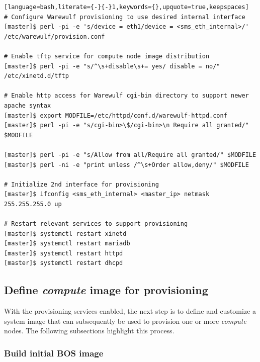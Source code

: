 \documentclass[letterpaper]{article}
\begin{document}
\begin{lstlisting}[language=bash,literate={-}{-}1,keywords={},upquote=true,keepspaces]
# Configure Warewulf provisioning to use desired internal interface
[master]$ perl -pi -e 's/device = eth1/device = <sms_eth_internal>/' /etc/warewulf/provision.conf

# Enable tftp service for compute node image distribution
[master]$ perl -pi -e "s/^\s+disable\s+= yes/ disable = no/" /etc/xinetd.d/tftp

# Enable http access for Warewulf cgi-bin directory to support newer apache syntax
[master]$ export MODFILE=/etc/httpd/conf.d/warewulf-httpd.conf
[master]$ perl -pi -e "s/cgi-bin>\$/cgi-bin>\n Require all granted/" $MODFILE

[master]$ perl -pi -e "s/Allow from all/Require all granted/" $MODFILE
[master]$ perl -ni -e "print unless /^\s+Order allow,deny/" $MODFILE

# Initialize 2nd interface for provisioning
[master]$ ifconfig <sms_eth_internal> <master_ip> netmask 255.255.255.0 up

# Restart relevant services to support provisioning
[master]$ systemctl restart xinetd  
[master]$ systemctl restart mariadb 
[master]$ systemctl restart httpd   
[master]$ systemctl restart dhcpd
\end{lstlisting}



\subsection{Define {\em compute} image for provisioning}

With the provisioning services enabled, the next step is to define and
customize a system image that can subsequently be used to provision one or more
{\em compute} nodes. The following subsections highlight this process.

\subsubsection{Build initial BOS image}
\end{document}
